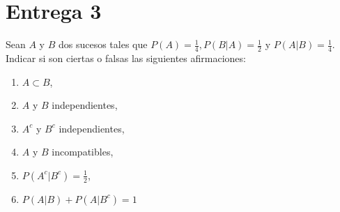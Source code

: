 

\section{Entrega 3}

\begin{ejr}
  Sean $A$ y $B$ dos sucesos tales que $P(A) = \frac{1}{4}, P(B | A) = \frac{1}{2}$ y $P(A | B) = \frac{1}{4}$. Indicar si son ciertas o falsas las siguientes afirmaciones:
  \begin{enumerate}
    \item $A \subset B$,
    \item $A$ y $B$ independientes,
    \item $A^{c}$ y $B^{c}$ independientes,
    \item $A$ y $B$ incompatibles,
    \item $P(A^{c} | B^{c}) = \frac{1}{2}$,
    \item $P(A | B) + P(A | B^{c}) = 1$
  \end{enumerate}
\end{ejr}

